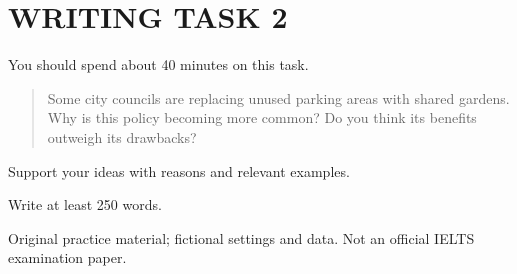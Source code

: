 \section*{WRITING TASK 2}
You should spend about 40 minutes on this task.

\begin{quote}\large Some city councils are replacing unused parking areas with shared gardens. Why is this policy becoming more common? Do you think its benefits outweigh its drawbacks?
\end{quote}
Support your ideas with reasons and relevant examples.

Write at least 250 words.
\par\bigskip
{\footnotesize\color{gray} Original practice material; fictional settings and data. Not an official IELTS examination paper.}
